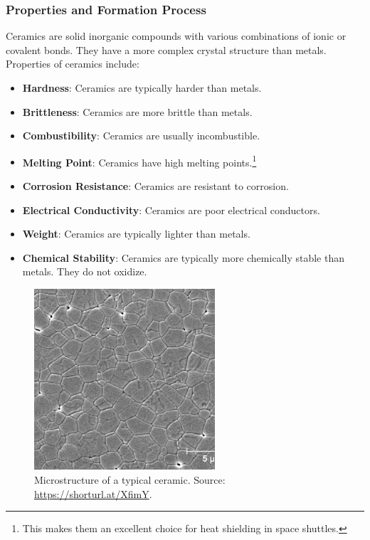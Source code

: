 \documentclass[12pt]{article}
\begin{document}
\subsubsection{Properties and Formation Process}
Ceramics are solid inorganic compounds with various combinations of ionic or
covalent bonds. They have a more complex crystal structure than metals.
Properties of ceramics include:
\begin{itemize}
    \item \textbf{Hardness}: Ceramics are typically harder than metals.
    \item \textbf{Brittleness}: Ceramics are more brittle than metals.
    \item \textbf{Combustibility}: Ceramics are usually incombustible.
    \item \textbf{Melting Point}: Ceramics have high melting points.\footnote{This makes them an excellent choice for heat shielding in space shuttles.}
    \item \textbf{Corrosion Resistance}: Ceramics are resistant to corrosion.
    \item \textbf{Electrical Conductivity}: Ceramics are poor electrical conductors.
    \item \textbf{Weight}: Ceramics are typically lighter than metals.
    \item \textbf{Chemical Stability}: Ceramics are typically more chemically stable than metals. They do not oxidize.
\end{itemize}

\begin{figure}[htbp]
    \centering
    \includegraphics[width=0.6\textwidth]{figures/chapter_2/ceramics_microstructure.jpg}
    \caption{Microstructure of a typical ceramic. Source: \url{https://shorturl.at/XfimY}.}\label{fig:ceramics_microstructure}
\end{figure}
\end{document}
